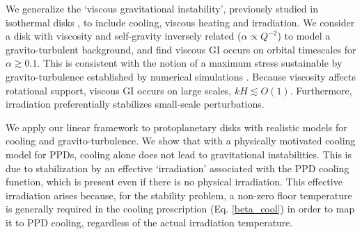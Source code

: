 
We generalize the `viscous gravitational instability', previously 
studied in isothermal disks
\citep{lynden-bell74,willerding92,gammie96}, to include 
cooling, viscous heating and irradiation. %
We consider a disk with viscosity and self-gravity inversely
related ($\alpha\propto Q^{-2}$) to model a 
gravito-turbulent background, and find viscous GI occurs on orbital
timescales for $\alpha\gtrsim 0.1$. This is consistent with the notion 
of a maximum stress sustainable by gravito-turbulence established 
by numerical simulations \citep{rice05}. Because viscosity affects 
rotational support, viscous GI occurs on large scales, $kH\lesssim
O(1)$.  Furthermore, irradiation preferentially
stabilizes small-scale perturbations. %
                             

We apply our linear framework to protoplanetary disks with 
realistic models for cooling and gravito-turbulence. 
We show that with a physically motivated cooling model for PPDs, 
cooling alone does not lead to gravitational instabilities. This is
due to stabilization by an effective `irradiation' associated with the
PPD cooling function, which is present even if there is no physical
irradiation. 
This effective irradiation arises because, for the stability problem,
a non-zero floor temperature is generally required in the cooling
prescription (Eq. \ref{beta_cool}) in order to map it to PPD cooling,
regardless of the actual irradiation temperature.     




